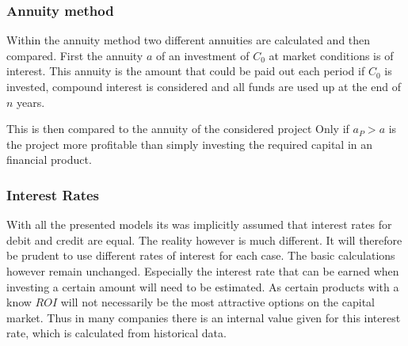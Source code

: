 \subsubsection{Annuity method}
Within the annuity method two different annuities are calculated and then compared. First the annuity $a$
of an investment of $C_0$ at market conditions is of interest. 
%
This annuity is the amount that could be paid out each period if $C_0$ is invested, compound interest 
is considered and all funds are used up at the end of $n$ years. 

This is then compared to the annuity of the considered project 
%
Only if $a_P > a$ is the project more profitable than simply investing the required capital in an 
financial product. 

\subsubsection{Interest Rates}
With all the presented models its was implicitly assumed that interest rates for debit and credit are 
equal. The reality however is much different. It will therefore be prudent to use different rates of interest
for each case. The basic calculations however remain unchanged. Especially the interest rate that can be
earned when investing a certain amount will need to be estimated. As certain products with a know $ROI$
will not necessarily be the most attractive options on the capital market. Thus in many companies
there is an internal value given for this interest rate, which is calculated from historical data. 





